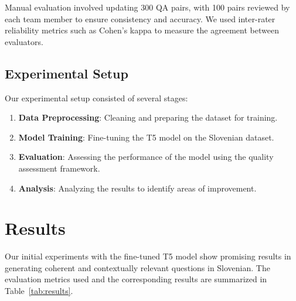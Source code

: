 \documentclass[fleqn,moreauthors,10pt]{ds_report}
\begin{document}
Manual evaluation involved updating 300 QA pairs, with 100 pairs reviewed by each team member to ensure consistency and accuracy. We used inter-rater reliability metrics such as Cohen’s kappa to measure the agreement between evaluators.

\subsection*{Experimental Setup}
Our experimental setup consisted of several stages:
\begin{enumerate}[noitemsep]
    \item \textbf{Data Preprocessing}: Cleaning and preparing the dataset for training.
    \item \textbf{Model Training}: Fine-tuning the T5 model on the Slovenian dataset.
    \item \textbf{Evaluation}: Assessing the performance of the model using the quality assessment framework.
    \item \textbf{Analysis}: Analyzing the results to identify areas of improvement.
\end{enumerate}


\section*{Results}
Our initial experiments with the fine-tuned T5 model show promising results in generating coherent and contextually relevant questions in Slovenian. The evaluation metrics used and the corresponding results are summarized in Table~\ref{tab:results}.

\begin{table}[hbt]
	\caption{Evaluation Metrics for Question Generation}
	\centering
	\label{tab:results}
\end{table}
\end{document}
